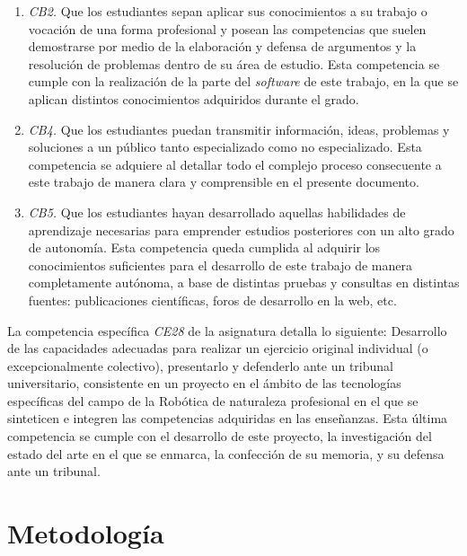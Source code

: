 \begin{enumerate}
    \item{\textit{CB2.} Que los estudiantes sepan aplicar sus conocimientos a su
        trabajo o vocación de una forma profesional y posean las competencias
        que suelen demostrarse por medio de la elaboración y defensa de
        argumentos y la resolución de problemas dentro de su área de estudio.}
        Esta competencia se cumple con la realización de la parte del
        \textit{software} de este trabajo, en la que se aplican distintos
        conocimientos adquiridos durante el grado.
    \item{\textit{CB4.} Que los estudiantes puedan transmitir información,
        ideas, problemas y soluciones a un público tanto especializado como no
        especializado.}
        Esta competencia se adquiere al detallar todo el complejo proceso
        consecuente a este trabajo de manera clara y comprensible en el presente
        documento.
    \item{\textit{CB5.} Que los estudiantes hayan desarrollado aquellas
        habilidades de aprendizaje necesarias para emprender estudios
        posteriores con un alto grado de autonomía.}
        Esta competencia queda cumplida al adquirir los conocimientos
        suficientes para el desarrollo de este trabajo de manera completamente
        autónoma, a base de distintas pruebas y consultas en distintas fuentes:
        publicaciones científicas, foros de desarrollo en la web, etc.
\end{enumerate}

La competencia específica \textit{CE28} de la asignatura detalla lo
siguiente:
Desarrollo de las capacidades adecuadas para realizar un ejercicio original
individual (o excepcionalmente colectivo), presentarlo y defenderlo ante un
tribunal universitario, consistente en un proyecto en el ámbito de las
tecnologías específicas del campo de la Robótica de naturaleza profesional en el
que se sinteticen e integren las competencias adquiridas en las enseñanzas.
Esta última competencia se cumple con el desarrollo de este proyecto, la
investigación  del estado del arte en el que se enmarca, la confección de su
memoria, y su defensa ante un tribunal.


\section{Metodología}
\label{sec:metodologia}

